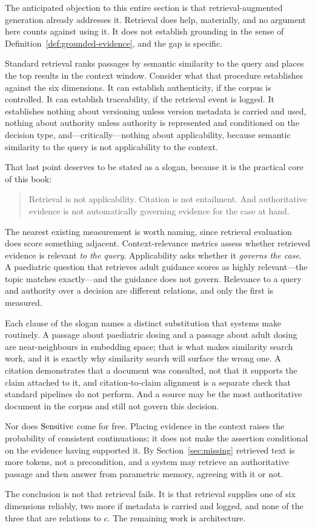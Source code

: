 The anticipated objection to this entire section is that retrieval-augmented
generation \citep{lewis2020} already addresses it. Retrieval does help, materially,
and no argument here counts against using it. It does not establish grounding in
the sense of Definition~\ref{def:grounded-evidence}, and the gap is specific.

Standard retrieval ranks passages by semantic similarity to the query and places
the top results in the context window. Consider what that procedure establishes
against the six dimensions. It can establish authenticity, if the corpus is
controlled. It can establish traceability, if the retrieval event is logged. It
establishes nothing about versioning unless version metadata is carried and used,
nothing about authority unless authority is represented and conditioned on the
decision type, and---critically---nothing about applicability, because semantic
similarity to the query is not applicability to the context.

That last point deserves to be stated as a slogan, because it is the practical core
of this book:

\begin{quote}
Retrieval is not applicability. Citation is not entailment. And authoritative
evidence is not automatically governing evidence for the case at hand.
\end{quote}

The nearest existing measurement is worth naming, since retrieval evaluation does
score something adjacent. Context-relevance metrics assess whether retrieved evidence
is relevant \emph{to the query}. Applicability asks whether it \emph{governs the
case}. A paediatric question that retrieves adult guidance scores as highly
relevant---the topic matches exactly---and the guidance does not govern. Relevance to a
query and authority over a decision are different relations, and only the first is
measured.

Each clause of the slogan names a distinct substitution that systems make routinely. A
passage
about paediatric dosing and a passage about adult dosing are near-neighbours in
embedding space; that is what makes similarity search work, and it is exactly why
similarity search will surface the wrong one. A citation demonstrates that a
document was consulted, not that it supports the claim attached to it, and
citation-to-claim alignment is a separate check that standard pipelines do not
perform. And a source may be the most authoritative document in the corpus and
still not govern this decision.

Nor does $\operatorname{Sensitive}$ come for free. Placing evidence in the context raises the
probability of consistent continuations; it does not make the assertion conditional
on the evidence having supported it. By Section~\ref{sec:missing} retrieved text is
more tokens, not a precondition, and a system may retrieve an authoritative passage
and then answer from parametric memory, agreeing with it or not.

The conclusion is not that retrieval fails. It is that retrieval supplies one of
six dimensions reliably, two more if metadata is carried and logged, and none of
the three that are relations to $c$. The remaining work is architecture.

